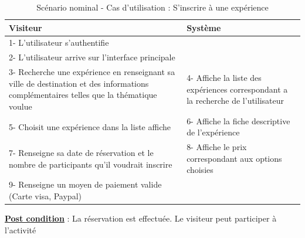 \begin{table}[h]
\begin{center}
\begin{tabular}{|p{8cm}|p{8cm}|}
\hline
Visiteur & Système\\
\hline
1- L’utilisateur s’authentifie & $ $\\
\hline	
2- L’utilisateur arrive sur l’interface principale & $ $\\
\hline 	
3- Recherche une expérience en renseignant sa ville de destination et des informations complémentaires telles que la thématique voulue & 4- Affiche la liste des expériences correspondant a la recherche de l'utilisateur\\
\hline
5- Choisit une expérience dans la liste affiche & 6- Affiche la fiche descriptive de l'expérience\\
\hline
7- Renseigne sa date de réservation et le nombre de participants qu’il voudrait inscrire & 8- Affiche le prix correspondant aux options choisies\\
\hline
9- Renseigne un moyen de paiement valide (Carte visa, Paypal) & $ $\\
\hline
\end{tabular}
\caption{Scénario nominal - Cas d'utilisation : S’inscrire à une expérience}
\end{center}
\end{table}
\begin{flushleft}
\underline{\textbf{Post condition}} : La réservation est effectuée. Le visiteur peut participer à l'activité
\end{flushleft}

